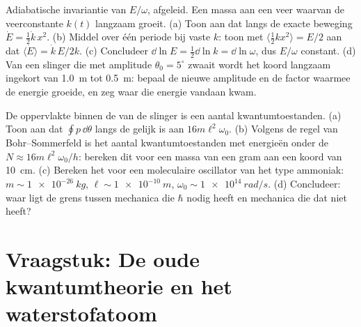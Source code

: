 \begin{exercise}[$\star\star\star$]\label{exo:b3:hamiltonian-mechanics:11}
Adiabatische invariantie van $E/\omega$, afgeleid. Een massa aan een veer
waarvan de veerconstante $k(t)$ langzaam groeit. (a) Toon aan dat langs
de exacte beweging $\dot E = \tfrac12\dot k\,
x^2$. (b) Middel over één
periode bij vaste $k$: toon met $\langle\tfrac12 kx^2\rangle = E/2$ aan
dat $\langle\dot E\rangle
= \dot k\,E/2k$. (c) Concludeer $\dd\ln E = \tfrac12\dd\ln k = \dd\ln
\omega$, dus $E/\omega$ constant. (d) Van een
slinger die met amplitude $\theta_0 = 5^\circ$ zwaait wordt het koord
langzaam ingekort van \qty{1.0}{m} tot \qty{0.5}{m}: bepaal de nieuwe
amplitude en de factor waarmee de energie groeide, en zeg waar die
energie vandaan kwam.
\end{exercise}

\begin{exercise}[$\star\star\star$]\label{exo:b3:hamiltonian-mechanics:12}
De oppervlakte binnen de  van de slinger is een aantal
kwantumtoestanden. (a) Toon aan dat $\oint p\,\dd\theta$ langs de
 gelijk is aan $16m\ell^2\omega_0$. (b) Volgens de regel van
Bohr--Sommerfeld is het aantal kwantumtoestanden met energieën onder de
 $N \approx
16m\ell^2\omega_0/h$: bereken dit voor een massa van
een gram aan een koord van \qty{10}{cm}. (c) Bereken het voor een
moleculaire oscillator van het type ammoniak: $m \sim \qty{1e-26}{kg}$,
$\ell \sim \qty{1e-10}{m}$, $\omega_0 \sim \qty{1e14}{rad/s}$. (d)
Concludeer: waar ligt de grens tussen mechanica die $\hbar$ nodig heeft
en mechanica die dat niet heeft?
\end{exercise}

\section{Vraagstuk: De oude kwantumtheorie en het waterstofatoom}

